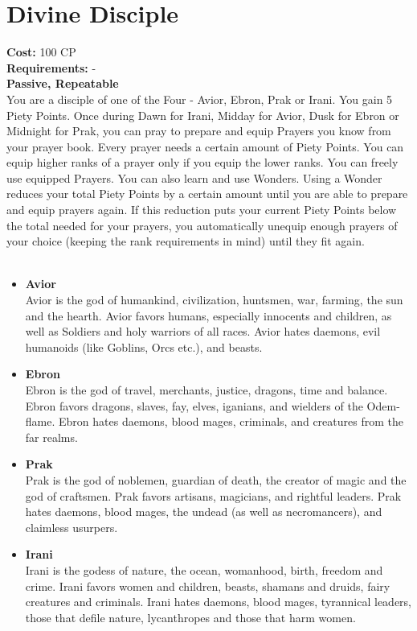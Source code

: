\section{Divine Disciple}\label{perk:divineDisciple}
\textbf{Cost:} 100 CP\\
\textbf{Requirements:} - \\
\textbf{Passive, Repeatable}\\
You are a disciple of one of the Four - Avior, Ebron, Prak or Irani.
You gain 5 Piety Points.
Once during Dawn for Irani, Midday for Avior, Dusk for Ebron or Midnight for Prak, you can pray to prepare and equip Prayers you know from your prayer book.
Every prayer needs a certain amount of Piety Points.
You can equip higher ranks of a prayer only if you equip the lower ranks.
You can freely use equipped Prayers.
You can also learn and use Wonders.
Using a Wonder reduces your total Piety Points by a certain amount until you are able to prepare and equip prayers again.
If this reduction puts your current Piety Points below the total needed for your prayers, you automatically unequip enough prayers of your choice (keeping the rank requirements in mind) until they fit again.\\
\\
\begin{itemize}
\item \textbf{Avior} \\
Avior is the god of humankind, civilization, huntsmen, war, farming, the sun and the hearth.
Avior favors humans, especially innocents and children, as well as Soldiers and holy warriors of all races.
Avior hates daemons, evil humanoids (like Goblins, Orcs etc.), and beasts.

\item \textbf{Ebron}\\
Ebron is the god of travel, merchants, justice, dragons, time and balance.
Ebron favors dragons, slaves, fay, elves, iganians, and wielders of the Odem-flame.
Ebron hates daemons, blood mages, criminals, and creatures from the far realms.

\item \textbf{Prak}\\
Prak is the god of noblemen, guardian of death, the creator of magic and the god of craftsmen.
Prak favors artisans, magicians, and rightful leaders.
Prak hates daemons, blood mages, the undead (as well as necromancers), and claimless usurpers.

\item \textbf{Irani}\\
Irani is the godess of nature, the ocean, womanhood, birth, freedom and crime.
Irani favors women and children, beasts, shamans and druids, fairy creatures and criminals.
Irani hates daemons, blood mages, tyrannical leaders, those that defile nature, lycanthropes and those that harm women.
\end{itemize}
